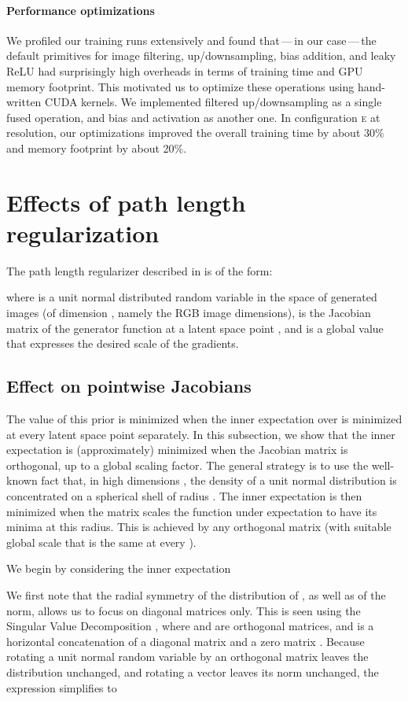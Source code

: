 \documentclass[10pt,twocolumn,letterpaper]{article}
\newcommand{\arch}[1]{\textsc{#1}}
\begin{document}
\paragraph{Performance optimizations}
We profiled our training runs extensively and found that\,---\,in our case\,---\,the default primitives for image filtering, up/downsampling, bias addition, and leaky ReLU had surprisingly high overheads in terms of training time and GPU memory footprint.
This motivated us to optimize these operations using hand-written CUDA kernels.
We implemented filtered up/downsampling as a single fused operation, and bias and activation as another one.
In configuration \arch{e} at  resolution, our optimizations improved the overall training time by about 30\% and memory footprint by about 20\%. 

\section{Effects of path length regularization}  \label{app:regularization}

The path length regularizer described in  is of the form:


where  is a unit normal distributed random variable in the space of generated images (of dimension , namely the RGB image dimensions),  is the Jacobian matrix of the generator function  at a latent space point , and  is a global value that expresses the desired scale of the gradients.

\subsection{Effect on pointwise Jacobians}
The value of this prior is minimized when the inner expectation over  is minimized at every latent space point  separately. In this subsection, we show that the inner expectation is (approximately) minimized when the Jacobian matrix  is orthogonal, up to a global scaling factor. The general strategy is to use the well-known fact that, in high dimensions , the density of a unit normal distribution is concentrated on a spherical shell of radius . The inner expectation is then minimized when the matrix  scales the function under expectation to have its minima at this radius. This is achieved by any orthogonal matrix (with suitable global scale that is the same at every ).

We begin by considering the inner expectation

We first note that the radial symmetry of the distribution of , as well as of the  norm, allows us to focus on diagonal matrices only. This is seen using the Singular Value Decomposition , where  and  are orthogonal matrices, and  is a horizontal concatenation of a diagonal matrix  and a zero matrix  \cite{Golub2013}. Because rotating a unit normal random variable by an orthogonal matrix leaves the distribution unchanged, and rotating a vector leaves its norm unchanged, the expression simplifies to
\end{document}
